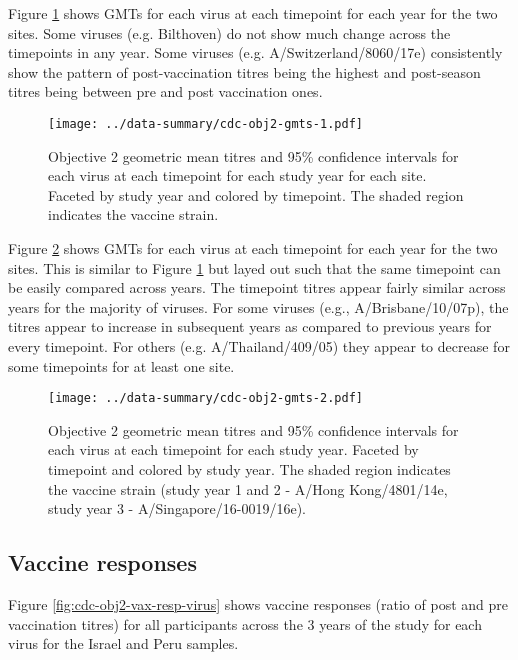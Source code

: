 \documentclass[12pt]{article}
\begin{document}
Figure \ref{fig:cdc-obj2-gmts-1} shows GMTs for each virus at each timepoint for each year for the two sites.
Some viruses (e.g. Bilthoven) do not show much change across the timepoints in
any year. Some viruses (e.g. A/Switzerland/8060/17e) consistently show the pattern of post-vaccination titres being the highest and post-season titres being between pre and post vaccination ones.

\begin{figure}
	\texttt{[image: ../data-summary/cdc-obj2-gmts-1.pdf]}
	\caption{Objective 2 geometric mean titres and 95\% confidence intervals for each virus at each timepoint for each study year for each site. Faceted by study year and colored by timepoint. The shaded region indicates the vaccine strain.}
	\label{fig:cdc-obj2-gmts-1}
\end{figure}

Figure \ref{fig:cdc-obj2-gmts-2} shows GMTs for each virus at each timepoint for each year for the two sites. This is similar to Figure \ref{fig:cdc-obj2-gmts-1} but layed out such that the same timepoint can be easily compared across years. The timepoint titres appear fairly similar across years for the majority of viruses. For some viruses (e.g., A/Brisbane/10/07p), the titres appear to increase in subsequent years as compared to previous years for every timepoint. For others (e.g. A/Thailand/409/05) they appear to decrease for some timepoints for at least one site.

\begin{figure}
	\texttt{[image: ../data-summary/cdc-obj2-gmts-2.pdf]}
	\caption{Objective 2 geometric mean titres and 95\% confidence intervals for each virus at each timepoint for each study year. Faceted by timepoint and colored by study year. The shaded region indicates the vaccine strain (study year 1 and 2 - A/Hong Kong/4801/14e, study year 3 - A/Singapore/16-0019/16e).}
	\label{fig:cdc-obj2-gmts-2}
\end{figure}

\subsection{Vaccine responses}

Figure \ref{fig:cdc-obj2-vax-resp-virus} shows vaccine responses (ratio of post and pre vaccination titres)
for all participants across the 3 years of the study for each virus for the Israel and Peru samples.
\end{document}
